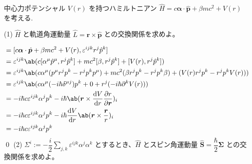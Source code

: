 \documentclass[uplatex,dvipdfmx,a4paper,11pt]{jlreq}
\makeatletter
\newcommand{\rr}{\bm{r}}
\newcommand{\pp}{\bm{p}}
\numberwithin{equation}{section}
\theoremstyle{definition}
\renewenvironment{proof}[1][\proofname]{\par
  \normalfont
  \topsep6\p@\@plus6\p@ \trivlist
  \item[\hskip\labelsep{\bfseries #1}\@addpunct{\bfseries}]\ignorespaces\quad\par
}{%
  \qed\endtrivlist\@endpefalse
}
\renewcommand\proofname{証明}
\makeatother
\begin{document}
\begin{problem}
中心力ポテンシャル $V(r)$ を持つハミルトニアン $\hat{H} = c\bm{\alpha}\cdot\hat{\pp} + \beta mc^2 + V(r)$ を考える.
\end{problem}
(1) $\hat{H}$ と軌道角運動量 $\hat{L} = \rr\times\hat{\pp}$ との交換関係を求めよ。
\begin{proof}
  \begin{align}
    [\hat{H}, \hat{L}^i] & = [c\bm{\alpha}\cdot\hat{\pp} + \beta mc^2 + V(r), \varepsilon^{ijk}r^j\hat{p}^k]                                              \\
                         & = \varepsilon^{ijk}\ab(c[\alpha^\mu\hat{p}^\mu, r^j\hat{p}^k] + mc^2[\beta, r^j\hat{p}^k] + [V(r), r^j\hat{p}^k])              \\
                         & = \varepsilon^{ijk}\ab(c\alpha^\mu(p^\mu r^jp^k - r^jp^kp^\mu) + mc^2(\beta r^jp^k - r^jp^k\beta) + (V(r)r^jp^k - r^jp^kV(r))) \\
                         & = \varepsilon^{ijk}\ab(c\alpha^\mu (-i\hbar\delta^{\mu j})p^k + 0 + r^j(-i\hbar\partial^kV(r)))                                \\
                         & = -i\hbar c\varepsilon^{ijk}\alpha^jp^k - i\hbar\ab(\rr\times\diff{V}{r}\diffp{r}{\rr})_i                                      \\
                         & = -i\hbar c\varepsilon^{ijk}\alpha^jp^k - i\hbar\diff{V}{r}\ab(\rr\times\frac{\rr}{r})_i                                       \\
                         & = -i\hbar c\varepsilon^{ijk}\alpha^jp^k
  \end{align}
\end{proof}
(2) $\Sigma^i := -\dfrac{i}{2}\sum_{j,k}\varepsilon^{ijk}\alpha^j\alpha^k$ とするとき、$\hat{H}$ とスピン角運動量 $\hat{\bm{S}} = \dfrac{\hbar}{2}\bm{\Sigma}$ との交換関係を求めよ。
\end{document}
